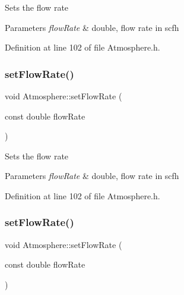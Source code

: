 Sets the flow rate 
\begin{DoxyParams}{Parameters}
{\em flow\+Rate} & double, flow rate in scfh \\
\hline
\end{DoxyParams}


Definition at line 102 of file Atmosphere.\+h.

\mbox{\label{class_atmosphere_a9ff0b718c810aec0bb101336db69fd22}} 
\subsubsection{\texorpdfstring{set\+Flow\+Rate()}{setFlowRate()}\hspace{0.1cm}{\footnotesize\ttfamily [2/3]}}
{\footnotesize\ttfamily void Atmosphere\+::set\+Flow\+Rate (\begin{DoxyParamCaption}\item[{const double}]{flow\+Rate }\end{DoxyParamCaption})\hspace{0.3cm}{\ttfamily [inline]}}

Sets the flow rate 
\begin{DoxyParams}{Parameters}
{\em flow\+Rate} & double, flow rate in scfh \\
\hline
\end{DoxyParams}


Definition at line 102 of file Atmosphere.\+h.

\mbox{\label{class_atmosphere_a9ff0b718c810aec0bb101336db69fd22}} 
\subsubsection{\texorpdfstring{set\+Flow\+Rate()}{setFlowRate()}\hspace{0.1cm}{\footnotesize\ttfamily [3/3]}}
{\footnotesize\ttfamily void Atmosphere\+::set\+Flow\+Rate (\begin{DoxyParamCaption}\item[{const double}]{flow\+Rate }\end{DoxyParamCaption})\hspace{0.3cm}{\ttfamily [inline]}}

